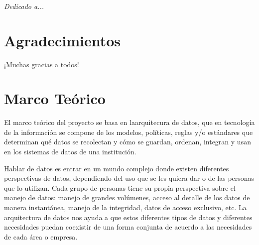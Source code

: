 \documentclass[a4paper,openright,12pt]{book}
\begin{document}
\newpage
$\ $
\thispagestyle{empty} %

\chapter*{}
\begin{flushright}
\textit{Dedicado a... \\}
\end{flushright}


\chapter*{Agradecimientos} %
 
¡Muchas gracias a todos!

\tableofcontents %

\cleardoublepage
{} %
\listoffigures %

\cleardoublepage
{} %
\listoftables %

\chapter*{Marco Teórico} \label{cap.mteorico}%

El marco teórico del proyecto se basa en laarquitecura de datos, que en tecnología de la información se compone de los modelos, políticas, reglas y/o estándares que determinan qué datos se recolectan y cómo se guardan, ordenan, integran y usan en los sistemas de datos de una institución.

Hablar de datos es entrar en un mundo complejo donde existen diferentes perspectivas de datos, dependiendo del uso que se les quiera dar o de las personas que lo utilizan. Cada grupo de personas tiene su propia perspectiva sobre el manejo de datos: manejo de grandes volúmenes, acceso al detalle de los datos de manera instantánea, manejo de la integridad, datos de acceso exclusivo, etc. La arquitectura de datos nos ayuda a que estos diferentes tipos de datos y diferentes necesidades puedan coexistir de una forma conjunta de acuerdo a las necesidades de cada área o empresa. 
\end{document}

